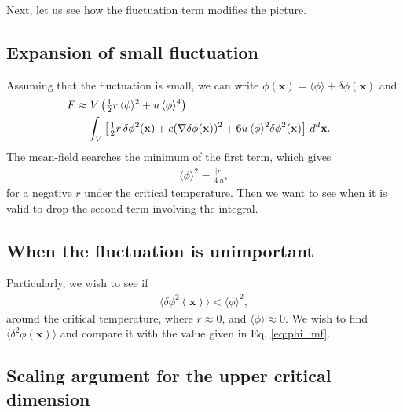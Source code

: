 \documentclass{article}
\begin{document}
Next, let us see how the fluctuation term modifies the picture.



\subsection{Expansion of small fluctuation}



Assuming that the fluctuation is small, we can write
$\phi(\mathbf x) = \langle \phi \rangle + \delta \phi(\mathbf x)$
and
\begin{align}
F
&\approx
V \left(
\tfrac{1}{2} r \, \langle \phi \rangle^2 + u \, \langle \phi \rangle^4
\right)
\notag
\\
&+
\int_V \left[
\tfrac{1}{2} r \, \delta \phi^2(\mathbf x)
+ c (\nabla \delta \phi(\mathbf x))^2
+ 6 u \, \langle \phi \rangle^2 \delta \phi^2(\mathbf x)
\right] \, d^d \mathbf x. \quad
\end{align}
The mean-field searches the minimum of the first term, which gives
\begin{align}
\langle \phi \rangle^2 = \frac{|r|}{4\,u},
\label{eq:phi_mf}
\end{align}
for a negative $r$ under the critical temperature.
Then we want to see when it is valid to drop the second term
involving the integral.


\subsection{When the fluctuation is unimportant}


Particularly, we wish to see if
\begin{align}
\langle \delta\phi^2(\mathbf x) \rangle
< \langle \phi \rangle^2,
\label{eq:phicmp}
\end{align}
around the critical temperature, where $r \approx 0$, and $\langle \phi \rangle \approx 0$.
We wish to find $\langle \delta^2 \phi(\mathbf x) \rangle$
and compare it with the value given in Eq. \eqref{eq:phi_mf}.


\subsection{Scaling argument for the upper critical dimension}
\end{document}
